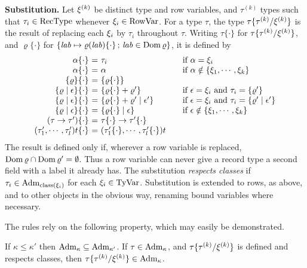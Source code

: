 \textbf{Substitution.} Let $\xi^{(k)}$ be distinct type and row
variables, and $\tau^{(k)}$ types such that $\tau_i \in \mathrm{RecType}$ whenever
$\xi_i \in \mathrm{RowVar}$. For a type $\tau$, the type $\tau\{\tau^{(k)} /
\xi^{(k)}\}$ is the result of replacing each $\xi_i$ by $\tau_i$
throughout $\tau$. Writing $\tau\{\cdot\}$ for $\tau\{\tau^{(k)} /
\xi^{(k)}\}$, and $\varrho\{\cdot\}$ for $\{\mathit{lab} \mapsto
\varrho(\mathit{lab})\{\cdot\} \,;\, \mathit{lab} \in \mathrm{Dom}\,\varrho\}$, it is defined by
\[
\begin{array}{@{}r@{\ =\ }l@{\qquad}l@{}}
  \alpha\{\cdot\} & \tau_i & \text{if}\ \alpha = \tyrowvar_i\\
  \alpha\{\cdot\} & \alpha & \text{if}\ \alpha \notin \{\tyrowvar_1, \cdots, \tyrowvar_k\}\\
  \rec{\varrho}\{\cdot\} & \rec{\varrho\{\cdot\}} &\\
  \orec{\varrho}{\epsilon}\{\cdot\} & \rec{\varrho\{\cdot\} + \varrho'} & \text{if}\ \epsilon = \tyrowvar_i\ \text{and}\ \tau_i = \rec{\varrho'}\\
  \orec{\varrho}{\epsilon}\{\cdot\} & \orec{\varrho\{\cdot\} + \varrho'}{\epsilon'} & \text{if}\ \epsilon = \tyrowvar_i\ \text{and}\ \tau_i = \orec{\varrho'}{\epsilon'}\\
  \orec{\varrho}{\epsilon}\{\cdot\} & \orec{\varrho\{\cdot\}}{\epsilon} & \text{if}\ \epsilon \notin \{\tyrowvar_1, \cdots, \tyrowvar_k\}\\
  (\tau \rightarrow \tau')\{\cdot\} & \tau\{\cdot\} \rightarrow \tau'\{\cdot\} &\\
  (\tau'_1, \cdots, \tau'_l)t\{\cdot\} & (\tau'_1\{\cdot\}, \cdots, \tau'_l\{\cdot\})t &
\end{array}
\]
The result is defined only if, wherever a row variable is replaced, $\mathrm{Dom}\,\varrho
\cap \mathrm{Dom}\,\varrho' = \emptyset$. Thus a row variable can never give a record
type a second field with a label it already has. %
The substitution \emph{respects classes} if $\tau_i \in
\mathrm{Adm}_{\mathrm{class}(\xi_i)}$ for each $\xi_i \in \mathrm{TyVar}$. Substitution is
extended to rows, as above, and to other objects in the obvious way, renaming
bound variables where necessary.

The rules rely on the following property, which may easily be demonstrated.

\begin{property}
If $\kappa \leq \kappa'$ then $\mathrm{Adm}_{\kappa} \subseteq \mathrm{Adm}_{\kappa'}$.
If $\tau \in \mathrm{Adm}_{\kappa}$, and $\tau\{\tau^{(k)}/\xi^{(k)}\}$ is defined
and respects classes, then $\tau\{\tau^{(k)}/\xi^{(k)}\} \in
\mathrm{Adm}_{\kappa}$.
\end{property}

